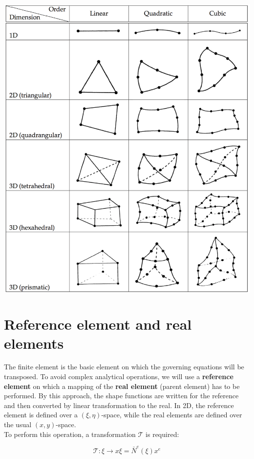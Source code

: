 	\begin{center}
	\includegraphics[scale=0.3]{ch6/3}
	\end{center}
	
\section{Reference element and real elements}
	The finite element is the basic element on which the governing equations will be transposed. To avoid complex analytical operations, we will use a \textbf{reference element} on which a mapping of the \textbf{real element} (parent element) has to be performed. By this approach, the shape functions are written for the reference and then converted by linear transformation to the real. In 2D, the reference element is defined over a $(\xi, \eta)$-space, while the real elements are defined over the usual $(x,y)$-space. \\
	
	To perform this operation, a transformation $\mathcal{T}$ is required: 
	
	\begin{equation}
	\mathcal{T} : \xi \rightarrow x{\xi} = \bar{N}^e (\xi) x^e
	\end{equation}
	
